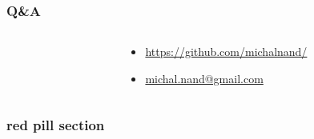 \documentclass{beamer}
\begin{document}
\begin{frame}
  
  \frametitle{Q\&A}

  \begin{columns}

    \begin{column}{0.5\textwidth}
    \end{column}

    \begin{column}{0.5\textwidth}
      \begin{itemize}
        \item \url{https://github.com/michalnand/}
        \item \url{michal.nand@gmail.com}
      \end{itemize}
    \end{column}

  \end{columns}

\end{frame}



\begin{frame}
  \frametitle{\bf \color{red} red pill section}
\end{frame}
\end{document}
